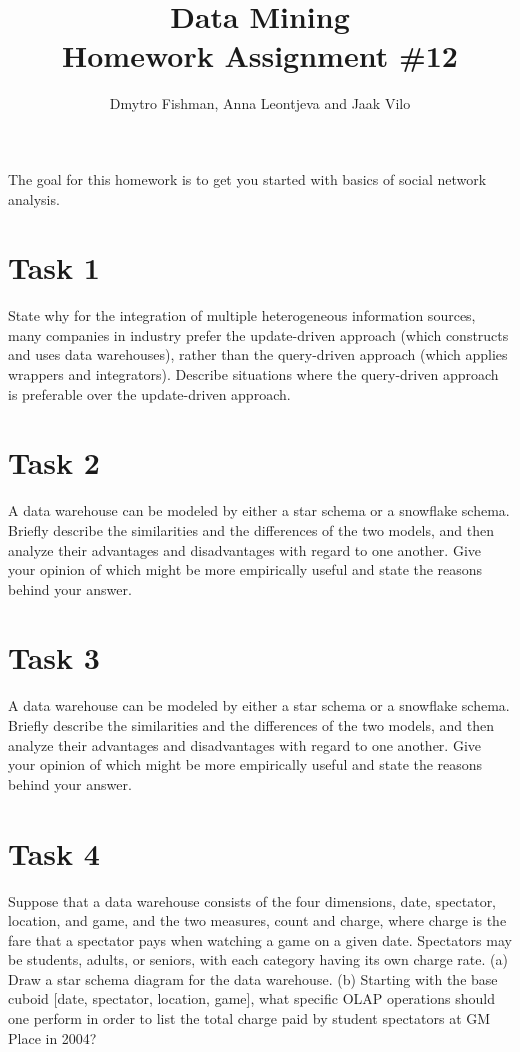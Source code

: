 \documentclass{article}
\title{Data Mining\\Homework Assignment \#12} %
\author{Dmytro Fishman, Anna Leontjeva and Jaak Vilo} %
\begin{document}
\maketitle %
The goal for this homework is to get you started with basics of social network analysis. 

\section*{Task 1}
State why for the integration of multiple heterogeneous information sources, many
companies in industry prefer the update-driven approach (which constructs and uses
data warehouses), rather than the query-driven approach (which applies wrappers and
integrators). Describe situations where the query-driven approach is preferable over
the update-driven approach.

\section*{Task 2}
A data warehouse can be modeled by either a star schema or a snowﬂake schema.
Brieﬂy describe the similarities and the differences of the two models, and then
analyze their advantages and disadvantages with regard to one another. Give your
opinion of which might be more empirically useful and state the reasons behind
your answer.

\section*{Task 3}
A data warehouse can be modeled by either a star schema or a snowﬂake schema.
Brieﬂy describe the similarities and the differences of the two models, and then
analyze their advantages and disadvantages with regard to one another. Give your
opinion of which might be more empirically useful and state the reasons behind
your answer.
 
\section*{Task 4}
Suppose that a data warehouse consists of the four dimensions, date, spectator, location, and game, and the two measures, count and charge, where charge is the fare that
a spectator pays when watching a game on a given date. Spectators may be students,
adults, or seniors, with each category having its own charge rate.
(a) Draw a star schema diagram for the data warehouse.
(b) Starting with the base cuboid [date, spectator, location, game], what speciﬁc OLAP
operations should one perform in order to list the total charge paid by student
spectators at GM Place in 2004?
\end{document}
